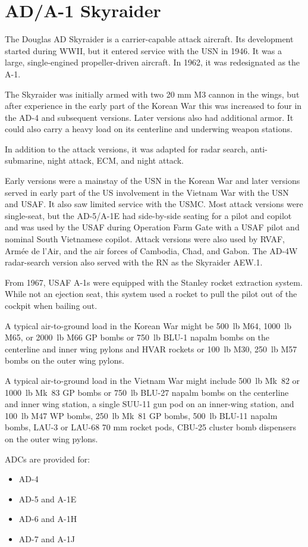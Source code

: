 \section*{AD/A-1 Skyraider}

The Douglas AD Skyraider is a carrier-capable attack aircraft. Its development started during WWII, but it entered service with the USN in 1946. It was a large, single-engined propeller-driven aircraft. In 1962, it was redesignated as the A-1.

The Skyraider was initially armed with two 20 mm M3 cannon in the wings, but after experience in the early part of the Korean War this was increased to four in the AD-4 and subsequent versions. Later versions also had additional armor. It could also carry a heavy load on its centerline and underwing weapon stations.

In addition to the attack versions, it was adapted for radar search, anti-submarine, night attack, ECM, and night attack.

Early versions were a mainstay of the USN in the Korean War and later versions served in early part of the US involvement in the Vietnam War with the USN and USAF. It also saw limited service with the USMC. Most attack versions were single-seat, but the AD-5/A-1E had side-by-side seating for a pilot and copilot and was used by the USAF during Operation Farm Gate with a USAF pilot and nominal South Vietnamese copilot. Attack versions were also used by RVAF, Armée de l'Air, and the air forces of Cambodia, Chad, and Gabon. The AD-4W radar-search version also served with the RN as the Skyraider AEW.1.

From 1967, USAF A-1s were equipped with the Stanley rocket extraction system. While not an ejection seat, this system used a rocket to pull the pilot out of the cockpit when bailing out.

A typical air-to-ground load in the Korean War might be 500~lb M64, 1000~lb M65, or 2000~lb M66 GP bombs or 750~lb BLU-1 napalm bombs on the centerline and inner wing pylons and HVAR rockets or 100~lb M30, 250~lb M57 bombs on the outer wing pylons.

A typical air-to-ground load in the Vietnam War might include 500~lb Mk~82 or 1000~lb Mk~83 GP bombs or 750~lb BLU-27 napalm bombs on the centerline and inner wing station, a single SUU-11 gun pod on an inner-wing station, and 100~lb M47 WP bombs, 250~lb Mk~81 GP bombs, 500~lb BLU-11 napalm bombs, LAU-3 or LAU-68 70 mm rocket pods, CBU-25 cluster bomb dispensers on the outer wing pylons.

ADCs are provided for:
\begin{itemize}
    \item AD-4
    \item AD-5 and A-1E
    \item AD-6 and A-1H
    \item AD-7 and A-1J
\end{itemize}